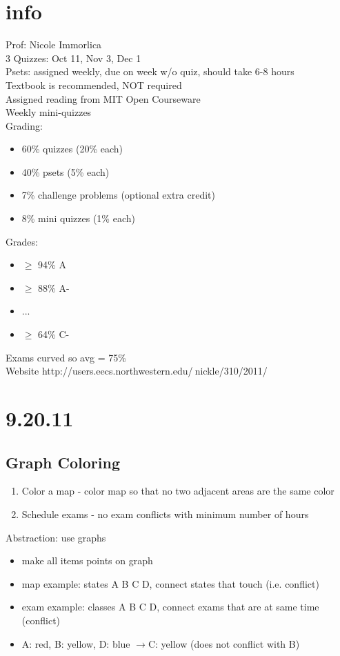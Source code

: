 \documentclass[a4paper]{article}
\newcommand{\ra}{$\rightarrow$}
\begin{document}
  \section{info}
	Prof: Nicole Immorlica\\
	3 Quizzes: Oct 11, Nov 3, Dec 1\\
	Psets: assigned weekly, due on week w/o quiz, should take 6-8 hours\\
	Textbook is recommended, NOT required\\
	Assigned reading from MIT Open Courseware\\
	Weekly mini-quizzes\\
	Grading:
	\begin{itemize}
	  \item 60\% quizzes (20\% each)
	  \item 40\% psets (5\% each)
      \item 7\% challenge problems (optional extra credit)
      \item 8\% mini quizzes (1\% each)
	\end{itemize}
	Grades:
	\begin{itemize}
	  \item $\ge$ 94\% A
	  \item $\ge$ 88\% A-
	  \item ...
	  \item $\ge$ 64\% C-
	\end{itemize}
	Exams curved so avg = 75\%\\
	Website http://users.eecs.northwestern.edu/$~$nickle/310/2011/\\
  \section{9.20.11}
    \subsection{Graph Coloring}
      \begin{enumerate}
        \item Color a map - color map so that no two adjacent areas are the same color
        \item Schedule exams - no exam conflicts with minimum number of hours
      \end{enumerate}
      Abstraction: use graphs\\
      \begin{itemize}
        \item make all items points on graph
        \item map example: states A B C D, connect states that touch (i.e. conflict)
        \item exam example: classes A B C D, connect exams that are at same time (conflict)
        \item A: red, B: yellow, D: blue \ra C: yellow (does not conflict with B) 
      \end{itemize}
\end{document}
